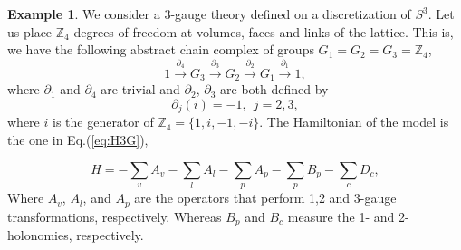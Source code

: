\documentclass[titlepage,11pt]{article}
\theoremstyle{plain}%
\theoremstyle{definition}
\newtheorem{exmp}[thm]{Example}
\theoremstyle{remark}
\begin{document}
\begin{exmp}
We consider a 3-gauge theory defined on a discretization of $S^3$. Let us place $\mathbb{Z}_4$ degrees of freedom at volumes, faces and links of the lattice. This is, we have the following abstract chain complex of groups $G_1=G_2=G_3=\mathbb{Z}_4$,
\begin{equation}\label{eq:3dcc}
 1\xrightarrow{\partial_4}  G_3\xrightarrow{\partial_3}G_2\xrightarrow{\partial_2} G_1\xrightarrow{\partial_1} 1,
\end{equation}
where $\partial_1$ and $\partial_4$ are trivial and $\partial_2$, $\partial_3$ are both defined by
$$\partial_j(i)=-1, \ \ j=2,3,$$
where $i$ is the generator of $\mathbb{Z}_4=\{1,i,-1,-i\}$.
The Hamiltonian of the model is the one in Eq.(\ref{eq:H3G}),

\begin{equation*}
H= -\sum_{v}A_v -\sum_{l}A_l -\sum_{p}A_p -\sum_{p}B_p -\sum_{c}D_c,
\end{equation*}
Where $A_v$, $A_l$, and $A_p$ are the operators that perform 1,2 and 3-gauge transformations, respectively. Whereas $B_p$ and $B_c$ measure the 1- and 2-holonomies, respectively. 


\end{exmp}
\end{document}
